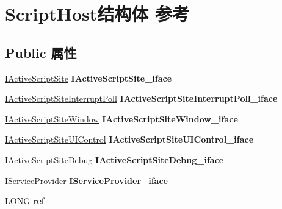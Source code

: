 \hypertarget{struct_script_host}{}\section{Script\+Host结构体 参考}
\label{struct_script_host}
\subsection*{Public 属性}
\begin{DoxyCompactItemize}
\item 
\mbox{\label{struct_script_host_a0572e3b872b6f2994265f1de4912ec3f}} 
\hyperlink{interface_i_active_script_site}{I\+Active\+Script\+Site} {\bfseries I\+Active\+Script\+Site\+\_\+iface}
\item 
\mbox{\label{struct_script_host_ab108dd701ed7af4191bac1757c434d5c}} 
\hyperlink{interface_i_active_script_site_interrupt_poll}{I\+Active\+Script\+Site\+Interrupt\+Poll} {\bfseries I\+Active\+Script\+Site\+Interrupt\+Poll\+\_\+iface}
\item 
\mbox{\label{struct_script_host_ad88254c648cb826215d4a8a1c4824669}} 
\hyperlink{interface_i_active_script_site_window}{I\+Active\+Script\+Site\+Window} {\bfseries I\+Active\+Script\+Site\+Window\+\_\+iface}
\item 
\mbox{\label{struct_script_host_ad49addc2b3c21f93777ab8bd7ae90fdb}} 
\hyperlink{interface_i_active_script_site_u_i_control}{I\+Active\+Script\+Site\+U\+I\+Control} {\bfseries I\+Active\+Script\+Site\+U\+I\+Control\+\_\+iface}
\item 
\mbox{\label{struct_script_host_a03e8785281640e8d5c15382da6ee4cf7}} 
I\+Active\+Script\+Site\+Debug {\bfseries I\+Active\+Script\+Site\+Debug\+\_\+iface}
\item 
\mbox{\label{struct_script_host_a65f42994bf89d2f51e5a2a5a4d597c98}} 
\hyperlink{interface_i_service_provider}{I\+Service\+Provider} {\bfseries I\+Service\+Provider\+\_\+iface}
\item 
\mbox{\label{struct_script_host_a02adcc0a4e2c31b2fac26d18dd24392f}} 
L\+O\+NG {\bfseries ref}

\end{DoxyCompactItemize}
